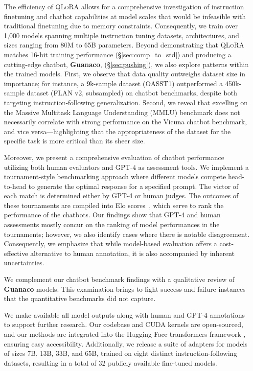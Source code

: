 The efficiency of \textsc{QLoRA} allows for a comprehensive investigation of instruction finetuning and chatbot capabilities at model scales that would be infeasible with traditional finetuning due to memory constraints. Consequently, we train over 1,000 models spanning multiple instruction tuning datasets, architectures, and sizes ranging from 80M to 65B parameters. Beyond demonstrating that \textsc{QLoRA} matches 16-bit training performance (\S\ref{sec:comp_to_std}) and producing a cutting-edge chatbot, \textbf{Guanaco}, (\S\ref{sec:pushing}), we also explore patterns within the trained models. First, we observe that data quality outweighs dataset size in importance; for instance, a 9k-sample dataset (OASST1) outperformed a 450k-sample dataset (FLAN v2, subsampled) on chatbot benchmarks, despite both targeting instruction-following generalization. Second, we reveal that excelling on the Massive Multitask Language Understanding (MMLU) benchmark does not necessarily correlate with strong performance on the Vicuna chatbot benchmark, and vice versa—highlighting that the appropriateness of the dataset for the specific task is more critical than its sheer size.

Moreover, we present a comprehensive evaluation of chatbot performance utilizing both human evaluators and GPT-4 as assessment tools. We implement a tournament-style benchmarking approach where different models compete head-to-head to generate the optimal response for a specified prompt. The victor of each match is determined either by GPT-4 or human judges. The outcomes of these tournaments are compiled into Elo scores~\citep{elo1967proposed, elo1978rating}, which serve to rank the performance of the chatbots. Our findings show that GPT-4 and human assessments mostly concur on the ranking of model performances in the tournaments; however, we also identify cases where there is notable disagreement. Consequently, we emphasize that while model-based evaluation offers a cost-effective alternative to human annotation, it is also accompanied by inherent uncertainties.

We complement our chatbot benchmark findings with a qualitative review of \textbf{Guanaco} models. This examination brings to light success and failure instances that the quantitative benchmarks did not capture.

We make available all model outputs along with human and GPT-4 annotations to support further research. Our codebase and CUDA kernels are open-sourced, and our methods are integrated into the Hugging Face transformers framework \citep{wolf2019huggingface}, ensuring easy accessibility. Additionally, we release a suite of adapters for models of sizes 7B, 13B, 33B, and 65B, trained on eight distinct instruction-following datasets, resulting in a total of 32 publicly available fine-tuned models.

